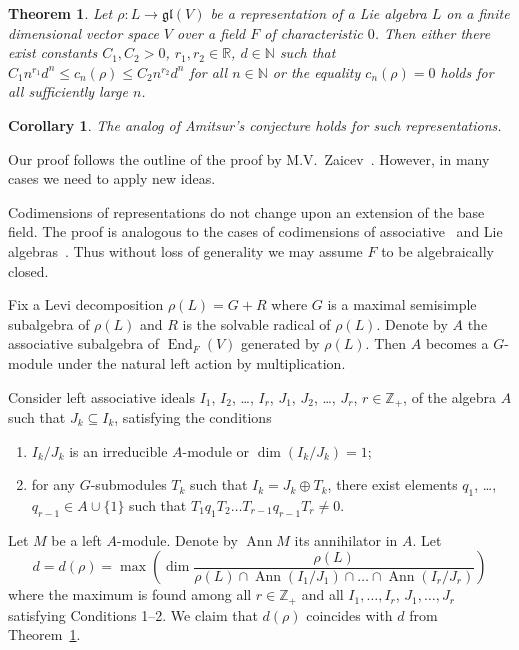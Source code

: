 \documentclass[12pt, reqno, a4paper]{amsart}
\theoremstyle{plain}
\newtheorem*{corollary}{Corollary}
\newtheorem{theorem}{Theorem}
\theoremstyle{remark}
\theoremstyle{definition}
\begin{document}
\begin{theorem}\label{TheoremMain}
Let $\rho \colon L \to \mathfrak{gl}(V)$ be a
representation of a Lie algebra $L$ on a finite dimensional vector space $V$
over a field $F$ of characteristic $0$. Then either
there exist constants $C_1, C_2 > 0$, $r_1, r_2 \in \mathbb R$, $d \in \mathbb N$
such that $C_1 n^{r_1} d^n \leqslant c_n(\rho) \leqslant C_2 n^{r_2} d^n$
for all $n \in \mathbb N$ or the equality $c_n(\rho)=0$
holds for all sufficiently large $n$.
\end{theorem}
\begin{corollary}
The analog of Amitsur's conjecture holds for such representations.
\end{corollary}

Our proof follows the outline of the proof by M.V.~Zaicev~\cite{ZaiLie}.
However, in many cases we need to apply new ideas.

Codimensions of representations do not change upon an extension of the base field.
The proof is analogous to the cases of codimensions of
associative~\cite[Theorem~4.1.9]{ZaiGia} and Lie algebras~\cite[Section~2]{ZaiLie}.
Thus without loss of generality we may assume $F$ to be algebraically closed.

Fix a Levi decomposition $\rho(L)=G+R$ where $G$ is a maximal semisimple
subalgebra of $\rho(L)$ and $R$ is the solvable radical of $\rho(L)$.
Denote by $A$ the associative subalgebra of $\operatorname{End}_F(V)$ generated by $\rho(L)$.
Then $A$ becomes a $G$-module under the natural left action by multiplication.

Consider left associative ideals $I_1$, $I_2$, \ldots, $I_r$,
$J_1$, $J_2$, \ldots, $J_r$, $r \in \mathbb Z_+$, of the algebra $A$ such that $J_k \subseteq I_k$,
satisfying the conditions
\begin{enumerate}
\item $I_k/J_k$ is an irreducible $A$-module or $\dim (I_k/J_k) = 1$;
\item for any $G$-submodules $T_k$
such that $I_k = J_k\oplus T_k$,
 there exist elements $q_1$, \ldots, $q_{r-1} \in A \cup \{1\}$
such that $T_1 q_1 T_2 \ldots T_{r-1} q_{r-1} T_r \ne 0$.
\end{enumerate}

Let $M$ be a left $A$-module. Denote by $\operatorname{Ann} M$ its annihilator in $A$.
Let $$d=d(\rho) = \max \left(\dim \frac{\rho(L)}{\rho(L) \cap \operatorname{Ann}(I_1/J_1) \cap \dots \cap \operatorname{Ann}(I_r/J_r)}\right)$$
where the maximum is found among all $r \in \mathbb Z_+$ and all $I_1, \ldots, I_r$, $J_1, \ldots, J_r$ satisfying Conditions 1--2. We claim that $d(\rho)$ coincides with $d$ from Theorem~\ref{TheoremMain}.
\end{document}
